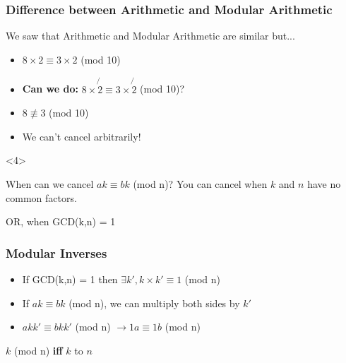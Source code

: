 \documentclass{beamer}
\begin{document}
\begin{frame}
  \frametitle{Difference between Arithmetic and Modular Arithmetic}

  {\larger

    We saw that Arithmetic and Modular Arithmetic are similar \alert{but...}

    \bigskip

    \begin{itemize}
    \item $8\times2 \equiv 3\times2$ (mod 10)
    \item<2-> {\bf Can we do:} $8\times \not{2} \equiv 3\times \not{2}$ (mod 10)?
    \item<3-> $8 \not\equiv 3$ (mod 10)

      \bigskip

    \item<3-> \alert{We can't cancel arbitrarily!}
    \end{itemize}

    \begin{onlyenv}<4>
    \begin{block}{When can we cancel $ak \equiv bk$ (mod n)?}
      You can cancel when $k$ and $n$ have no common factors.

      \bigskip

      OR, when GCD(k,n) = 1      
    \end{block}
    \end{onlyenv}
  }  
\end{frame}

\begin{frame}
  \frametitle{Modular Inverses}

  {\larger

    \begin{itemize}
    \item {} If GCD(k,n) = 1 then
      $\exists k', k\times k' \equiv 1$ (mod n)

      \bigskip
      
    \item If $ak \equiv bk$ (mod n), we can multiply both sides by $k'$
    \item $akk' \equiv bkk'$ (mod n) $\rightarrow 1a \equiv 1b$ (mod n)
    \end{itemize}

    \vfill

    $k$  (mod n) {\bf iff}
    $k$  to $n$
  }
\end{frame}
\end{document}
